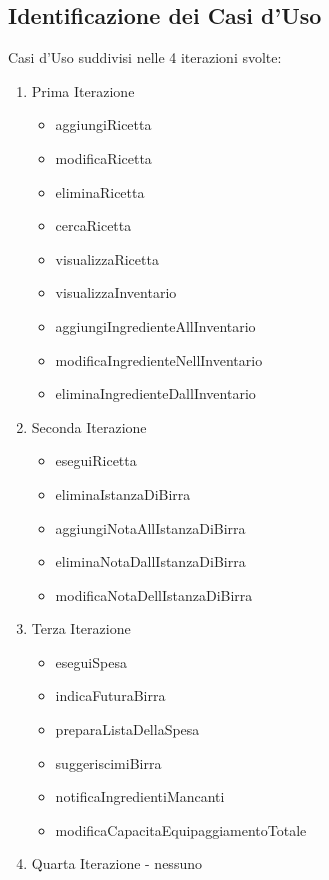 \documentclass[a4paper,12pt]{report}
\begin{document}
		\subsection{Identificazione dei Casi d'Uso}
			Casi d'Uso suddivisi nelle 4 iterazioni svolte:
			\begin{enumerate}
    				\item Prima Iterazione
					\begin{itemize}
						\item aggiungiRicetta	
						\item modificaRicetta	
						\item eliminaRicetta	
						\item cercaRicetta	
						\item visualizzaRicetta	
						\item visualizzaInventario	
						\item aggiungiIngredienteAllInventario	
						\item modificaIngredienteNellInventario	
						\item eliminaIngredienteDallInventario
					\end{itemize}
    				\item Seconda Iterazione
					\begin{itemize}
						\item eseguiRicetta	
						\item eliminaIstanzaDiBirra	
						\item aggiungiNotaAllIstanzaDiBirra		
						\item eliminaNotaDallIstanzaDiBirra	
						\item modificaNotaDellIstanzaDiBirra		
					\end{itemize}			
    				\item Terza Iterazione
					\begin{itemize}
						\item eseguiSpesa	
						\item indicaFuturaBirra	
						\item preparaListaDellaSpesa	
						\item suggeriscimiBirra	
						\item notificaIngredientiMancanti	
						\item modificaCapacitaEquipaggiamentoTotale		
					\end{itemize}
				\item Quarta Iterazione - nessuno
			\end{enumerate}
		
\end{document}
